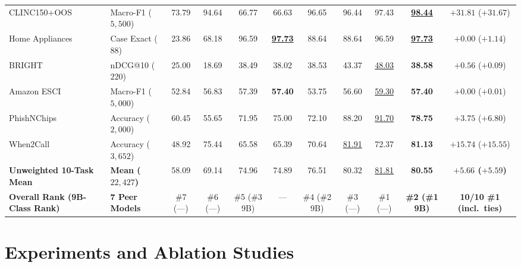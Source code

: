 \documentclass[10pt,twocolumn]{article}
\begin{document}
\begin{table}[t]
{\begin{tabular}{llccccccccc}
CLINC150+OOS \citep{larson2019clinc150} & Macro-F1 ($5{,}500$) & 73.79 & 94.64 & 66.77 & 66.63 & 96.65 & 96.44 & 97.43 & \underline{\textbf{98.44}} & $+31.81$ ($+31.67$) \\
Home Appliances & Case Exact ($88$) & 23.86 & 68.18 & 96.59 & \underline{\textbf{97.73}} & 88.64 & 88.64 & 96.59 & \underline{\textbf{97.73}} & $+0.00$ ($+1.14$) \\
BRIGHT \citep{su2025bright} & nDCG@10 ($220$) & 25.00 & 18.69 & 38.49 & 38.02 & 38.53 & 43.37 & \underline{48.03} & \textbf{38.58} & $+0.56$ ($+0.09$) \\
Amazon ESCI \citep{reddy2022esci} & Macro-F1 ($5{,}000$) & 52.84 & 56.83 & 57.39 & \textbf{57.40} & 53.75 & 56.60 & \underline{59.30} & \textbf{57.40} & $+0.00$ ($+0.01$) \\
PhishNChips \citep{anisselbd2026phishnchips} & Accuracy ($2{,}000$) & 60.45 & 55.65 & 71.95 & 75.00 & 72.10 & 88.20 & \underline{91.70} & \textbf{78.75} & $+3.75$ ($+6.80$) \\
When2Call \citep{ross2025when2call} & Accuracy ($3{,}652$) & 48.92 & 75.44 & 65.58 & 65.39 & 70.64 & \underline{81.91} & 72.37 & \textbf{81.13} & $+15.74$ ($+15.55$) \\
\midrule
\textbf{Unweighted 10-Task Mean} & \textbf{Mean ($22{,}427$)} & 58.09 & 69.14 & 74.96 & 74.89 & 76.51 & 80.32 & \underline{81.81} & \textbf{80.55} & \textbf{$+5.66$ ($+5.59$)} \\
\textbf{Overall Rank (9B-Class Rank)} & \textbf{7 Peer Models} & \#7 (---) & \#6 (---) & \#5 (\#3 9B) & --- & \#4 (\#2 9B) & \#3 (---) & \#1 (---) & \textbf{\#2 (\#1 9B)} & \textbf{10/10 \#1 (incl.\ ties)} \\
\bottomrule
\end{tabular}%
}
\end{table}

\section{Experiments and Ablation Studies}
\label{sec:experiments}
\end{document}
